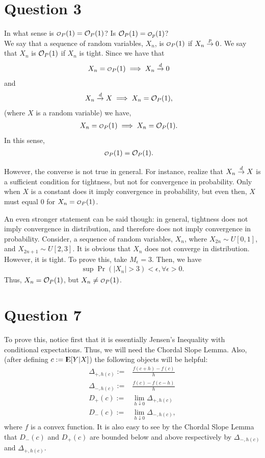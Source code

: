 \documentclass[12pt]{paper}
\newcommand{\Expect}{{\rm I\kern-.3em E}}
\begin{document}
\section{Question 3}
In what sense is $\smallO_P(1)=\bigO_P(1)$? Is $\bigO_P(1)=\smallO_p(1)$?
\\

We say that a sequence of random variables, $X_n$, is $\smallO_P(1)$ if $X_n \overset{p}{\to} 0$. We say that $X_n$ is $\mathcal{O}_P(1)$ if $X_n$ is tight. Since we have that 
\begin{align*}
X_n=\smallO_P(1) &\implies X_n \convDist 0
\end{align*}
and
\begin{align*}
X_n \overset{d}{\to} X &\implies X_n=\mathcal{O}_P(1),
\end{align*}
(where $X$ is a random variable) we have,
\begin{align*}
X_n=\smallO_P(1) &\implies X_n=\bigO_P(1).
\end{align*}
In this sense,
\begin{align*}
\smallO_P(1)&=\bigO_P(1).
\end{align*}

However, the converse is not true in general. For instance, realize that $X_n \overset{d}{\to} X$ is a sufficient condition for tightness, but not for convergence in probability. Only when $X$ is a constant does it imply convergence in probability, but even then, $X$ must equal $0$ for $X_n=\smallO_P(1)$.

An even stronger statement can be said though: in general, tightness does not imply convergence in distribution, and therefore does not imply convergence in probability. Consider, a sequence of random variables, $X_n$, where $X_{2n} \sim U[0,1]$, and $X_{2n+1} \sim U[2,3]$. It is obvious that $X_n$ does not converge in distribution. However, it is tight. To prove this, take $M_\epsilon=3$. Then, we have
\begin{align*}
\sup \Pr (|X_n|> 3)< \epsilon, \forall \epsilon >0.
\end{align*}
Thus, $X_n=\mathcal{O}_P(1)$, but $X_n \ne \smallO_P(1)$.

\section{Question 7}
To prove this, notice first that it is essentially Jensen's Inequality with conditional expectations. Thus, we will need the Chordal Slope Lemma. Also, (after defining $c:=\Expect[Y|X]$) the following objects will be helpful:
\begin{align*}
\Delta_{+,h(c)} :=& \frac{f(c+h)-f(c)}{h}\\
\Delta_{-,h(c)}:=&\frac{f(c)-f(c-h)}{h}\\
D_+(c):=&\lim_{h\downarrow0}\Delta_{+,h(c)}\\
D_-(c):=&\lim_{h\downarrow0}\Delta_{-,h(c)},
\end{align*}
where $f$ is a convex function. It is also easy to see by the Chordal Slope Lemma that $D_-(c)$ and $D_+(c)$ are bounded below and above respectively by $\Delta_{-,h(c)}$ and $\Delta_{+,h(c)}$.
\end{document}
